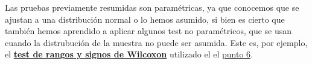 \documentclass[
]{article}
\begin{document}
Las pruebas previamente resumidas son paramétricas, ya que conocemos que
se ajustan a una distribución normal o lo hemos asumido, si bien es
cierto que también hemos aprendido a aplicar algunos test no
paramétricos, que se usan cuando la distrubución de la muestra no puede
ser asumida. Este es, por ejemplo, el
\href{https://www.r-bloggers.com/wilcoxon-signed-rank-test/}{\textbf{test
de rangos y signos de Wilcoxon}} utilizado el el
\protect\hyperlink{p6}{punto 6}.
\end{document}
